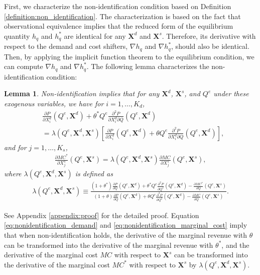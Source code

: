 \documentclass[11pt, a4paper]{article}
\newtheorem{lemma}{Lemma}
\begin{document}
First, we characterize the non-identification condition based on Definition \ref{definition:non_identification}.
The characterization is based on the fact that observational equivalence implies that the reduced form of the equilibrium quantity $h_q$ and $h_q^{*}$ are identical for any $\bm{X}^{d}$ and $\bm{X}^{s}$.
Therefore, its derivative with respect to the demand and cost shifters, $\nabla h_q$ and $\nabla h_q^{*}$, should also be identical.
Then, by applying the implicit function theorem to the equilibrium condition, we can compute $\nabla h_q$ and $\nabla h_q^{*}$.
The following lemma characterizes the non-identification condition:
\begin{lemma}\label{lemma:nonidentification_charaterization}
    Non-identification implies that for any $\bm{X}^{d}$, $\bm{X}^{s}$, and $Q^e$ under these exogenous variables, we have for $i = 1, \ldots, K_d$,
    \begin{align}
        &\frac{\partial P}{\partial X^{d}_i}(Q^e, \bm{X}^{d}) + \theta^{*} Q^e \frac{\partial^2 P}{\partial X^{d}_i\partial Q}(Q^e, \bm{X}^{d})\\  
        &= \lambda(Q^e, \bm{X}^{d}, \bm{X}^{s})\left[ \frac{\partial P}{\partial X^{d}_i}(Q^e, \bm{X}^{d}) + \theta Q^e \frac{\partial^2 P}{\partial X^{d}_i\partial Q}(Q^e, \bm{X}^{d}) \right], \label{eq:nonidentification_demand}
    \end{align}
    and for $j = 1,\ldots, K_s$,
    \begin{align}
        \frac{\partial MC^{*}}{\partial X^{s}_j}(Q^e, \bm{X}^{s}) = \lambda(Q^e, \bm{X}^{d}, \bm{X}^{s}) \frac{\partial MC}{\partial X^{s}_j}(Q^e, \bm{X}^{s}),\label{eq:nonidentification_marginal_cost}
    \end{align}
    where $\lambda(Q^e, \bm{X}^{d}, \bm{X}^{s})$ is defined as
    \begin{align}
        \lambda(Q^e, \bm{X}^{d}, \bm{X}^{s}) \equiv \frac{(1+\theta^{*})\frac{\partial P}{\partial Q}(Q^e, \bm{X}^{d}) + \theta^{*} Q^e\frac{\partial^2 P}{\partial Q^2}(Q^e, \bm{X}^{d}) - \frac{\partial MC^{*}}{\partial Q}(Q^e, \bm{X}^{s})}{(1+\theta)\frac{\partial P}{\partial Q}(Q^e, \bm{X}^{d}) + \theta Q^e\frac{\partial^2 P}{\partial Q^2}(Q^e, \bm{X}^{d}) - \frac{\partial MC}{\partial Q}(Q^e, \bm{X}^{s})}. \label{eq:lambda_foc}
    \end{align}
\end{lemma}
See Appendix \ref{appendix:proof} for the detailed proof.
Equation \eqref{eq:nonidentification_demand} and \eqref{eq:nonidentification_marginal_cost} imply that when non-identification holds, the derivative of the marginal revenue with $\theta$ can be transformed into the derivative of the marginal revenue with $\theta^{*}$, and the derivative of the marginal cost $MC$ with respect to $\bm{X}^{s}$ can be transformed into the derivative of the marginal cost $MC^{*}$ with respect to $\bm{X}^{s}$ by $\lambda(Q^e, \bm{X}^{d}, \bm{X}^{s})$.
\end{document}
